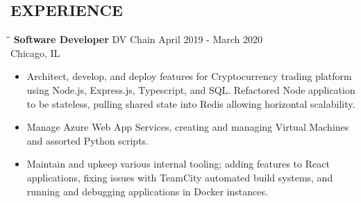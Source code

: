 \documentclass{res}
\begin{document}
 

\address{\bf  1029 W Irving Park Rd \\Chicago, IL 60613 \\(857) 407-8840 \\ ronbrz@protonmail.ch \\ ronbrz.com}
\begin{resume}
\section{EXPERIENCE}
\vspace{0in}
\begin{tabbing}
  \hspace{2.3in}\= \hspace{2.6in}\= \kill %
  {\bf Software Developer} \>DV Chain     \> April 2019 - March 2020\\
  \>Chicago, IL
\end{tabbing}
\begin{itemize}[leftmargin= .1in] \itemsep -2pt
\item Architect, develop, and deploy features for Cryptocurrency trading platform using Node.js, Express.js,
  Typescript, and SQL. Refactored Node application to be stateless, pulling shared state into Redis allowing
  horizontal scalability.
\item Manage Azure Web App Services, creating and managing Virtual Machines and assorted Python scripts. 
\item Maintain and upkeep various internal tooling; adding features to React applications, fixing issues
  with TeamCity automated build systems, and running and debugging applications in Docker instances.
  

\end{itemize}
\end{resume}
\end{document}
